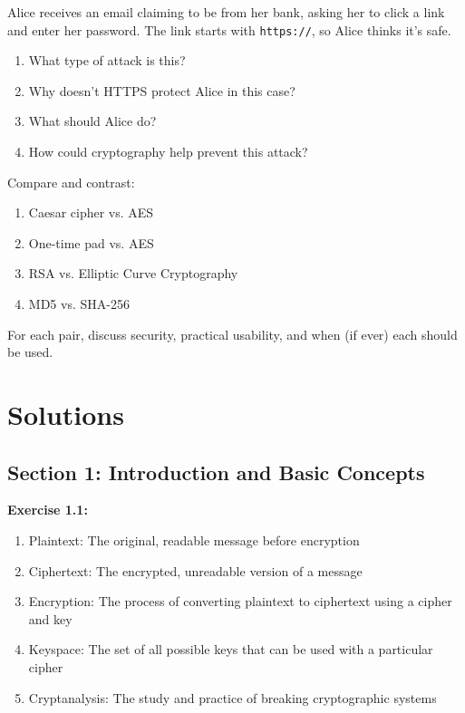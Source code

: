 \documentclass[11pt,a4paper]{report}
\begin{document}
\begin{ex}
Alice receives an email claiming to be from her bank, asking her to click a link and enter her password. The link starts with \texttt{https://}, so Alice thinks it's safe.

\begin{enumerate}[label=\alph*)]
    \item What type of attack is this?
    \item Why doesn't HTTPS protect Alice in this case?
    \item What should Alice do?
    \item How could cryptography help prevent this attack?
\end{enumerate}
\end{ex}

\begin{ex}
Compare and contrast:
\begin{enumerate}[label=\alph*)]
    \item Caesar cipher vs. AES
    \item One-time pad vs. AES
    \item RSA vs. Elliptic Curve Cryptography
    \item MD5 vs. SHA-256
\end{enumerate}

For each pair, discuss security, practical usability, and when (if ever) each should be used.
\end{ex}

\newpage
\section*{Solutions}

\subsection*{Section 1: Introduction and Basic Concepts}

\textbf{Exercise 1.1:}
\begin{enumerate}[label=\alph*)]
    \item Plaintext: The original, readable message before encryption
    \item Ciphertext: The encrypted, unreadable version of a message
    \item Encryption: The process of converting plaintext to ciphertext using a cipher and key
    \item Keyspace: The set of all possible keys that can be used with a particular cipher
    \item Cryptanalysis: The study and practice of breaking cryptographic systems
\end{enumerate}
\end{document}
